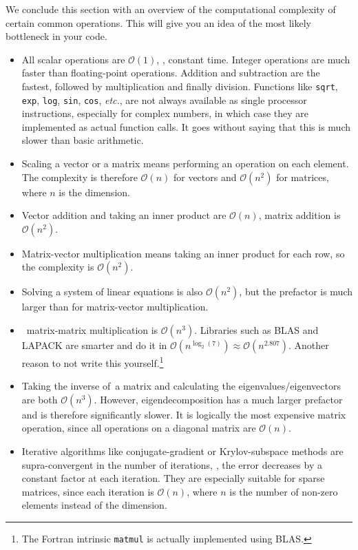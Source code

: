\documentclass[openany,oneside]{report}
\begin{document}
We conclude this section with an overview of the computational complexity of certain common operations.
This will give you an idea of the most likely bottleneck in your code.
\begin{itemize}
  \item All scalar operations are $\mathcal{O}(1)$, \ie, constant time.
    Integer operations are much faster than floating-point operations.
    Addition and subtraction are the fastest, followed by multiplication and finally division.
    Functions like \texttt{sqrt}, \texttt{exp}, \texttt{log}, \texttt{sin}, \texttt{cos}, \emph{etc.}, are not always available as single processor instructions, especially for complex numbers, in which case they are implemented as actual function calls.
    It goes without saying that this is much slower than basic arithmetic.
  \item Scaling a vector or a matrix means performing an operation on each element.
    The complexity is therefore $\mathcal{O}(n)$ for vectors and $\mathcal{O}\left(n^2\right)$ for matrices, where $n$ is the dimension.
  \item Vector addition and taking an inner product are $\mathcal{O}(n)$, matrix addition is $\mathcal{O}\left(n^2\right)$.
  \item Matrix-vector multiplication means taking an inner product for each row, so the complexity is $\mathcal{O}\left(n^2\right)$.
  \item Solving a system of linear equations is also $\mathcal{O}\left(n^2\right)$, but the prefactor is much larger than for matrix-vector multiplication.
  \item \Naive\ matrix-matrix multiplication is $\mathcal{O}\left(n^3\right)$.
    Libraries such as BLAS and LAPACK are smarter and do it in $\mathcal{O}\left(n^{\log_2(7)}\right)\approx\mathcal{O}\left(n^{2.807}\right)$.
    Another reason to not write this yourself.\footnote{The Fortran intrinsic \texttt{matmul} is actually implemented using BLAS.}
  \item Taking the inverse of\ a matrix and calculating the eigenvalues/eigenvectors are both $\mathcal{O}\left(n^3\right)$.
    However, eigendecomposition has a much larger prefactor and is therefore significantly slower.
    It is logically the most expensive matrix operation, since all operations on a diagonal matrix are $\mathcal{O}(n)$.
  \item Iterative algorithms like conjugate-gradient or Krylov-subspace methods are supra-\linebreak convergent in the number of iterations, \ie, the error decreases by a constant factor at each iteration.
    They are especially suitable for sparse matrices, since each iteration is $\mathcal{O}(n)$, where $n$ is the number of non-zero elements instead of the dimension.
\end{itemize}
\end{document}
